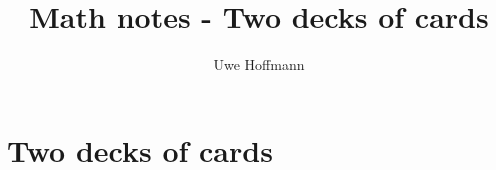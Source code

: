

\title{Math notes - Two decks of cards}
\author{Uwe Hoffmann}



\setcounter{chapter}{1}
\chapter*{Two decks of cards}

